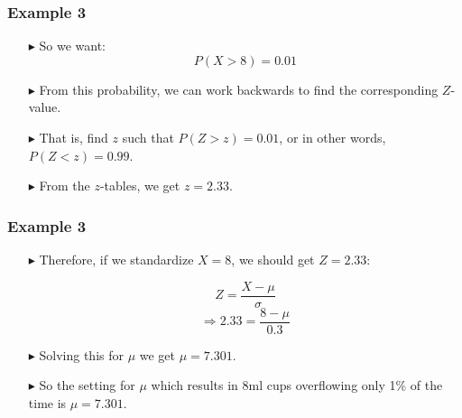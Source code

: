 \documentclass[12pt]{beamer}
\begin{document}
	\begin{frame}
		\frametitle{Example 3}
		
		\begin{itemize}
			\item[\color{blue}$\blacktriangleright$] So we want:
			\[
			P(X > 8) = 0.01
			\]
			
			\item[\color{blue}$\blacktriangleright$] From this probability, we can work backwards to 
			find the corresponding $Z$-value.
			
			\item[\color{blue}$\blacktriangleright$] That is, find $z$ such that $P(Z > z) = 0.01$, or in 
			other words, $P(Z < z) = 0.99$.
			
			\item[\color{blue}$\blacktriangleright$] From the $z$-tables, we get $z = 2.33$.
		\end{itemize}
		
		\end{frame}
		\begin{frame}
			\frametitle{Example 3}
			
			\begin{itemize}
				\item[\color{blue}$\blacktriangleright$] Therefore, if we standardize $X = 8$, we should get 
				$Z = 2.33$:
				
				\vspace{0.5em}
				\[
				Z = \frac{X - \mu}{\sigma}
				\]
				\[
				\Rightarrow 2.33 = \frac{8 - \mu}{0.3}
				\]
				\vspace{0.5em}
				
				\item[\color{blue}$\blacktriangleright$] Solving this for $\mu$ we get $\mu = 7.301$.
				
				\item[\color{blue}$\blacktriangleright$] So the setting for $\mu$ which results in 8ml cups 
				overflowing only 1\% of the time is $\mu = 7.301$.
			\end{itemize}
			
		\end{frame}
\end{document}
